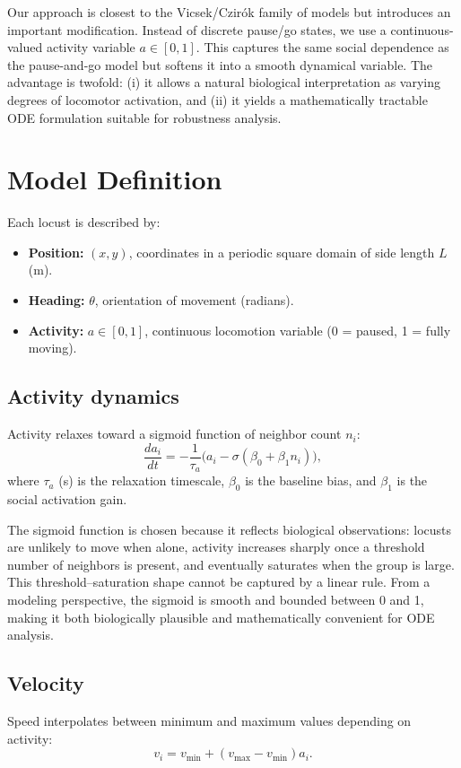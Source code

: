 \documentclass[11pt,a4paper]{article}
\begin{document}
Our approach is closest to the Vicsek/Czirók family of models but introduces an important modification. Instead of discrete pause/go states, we use a continuous-valued activity variable $a \in [0,1]$. This captures the same social dependence as the pause-and-go model but softens it into a smooth dynamical variable. The advantage is twofold: (i) it allows a natural biological interpretation as varying degrees of locomotor activation, and (ii) it yields a mathematically tractable ODE formulation suitable for robustness analysis.

\section{Model Definition}

Each locust is described by:
\begin{itemize}
    \item \textbf{Position:} $(x,y)$, coordinates in a periodic square domain of side length $L$ (m).
    \item \textbf{Heading:} $\theta$, orientation of movement (radians).
    \item \textbf{Activity:} $a \in [0,1]$, continuous locomotion variable (0 = paused, 1 = fully moving).
\end{itemize}

\subsection{Activity dynamics}
Activity relaxes toward a sigmoid function of neighbor count $n_i$:
\[
\frac{da_i}{dt} = -\frac{1}{\tau_a}\Big(a_i - \sigma(\beta_0 + \beta_1 n_i)\Big),
\]
where $\tau_a$ (s) is the relaxation timescale, $\beta_0$ is the baseline bias, and $\beta_1$ is the social activation gain. 

The sigmoid function is chosen because it reflects biological observations: locusts are unlikely to move when alone, activity increases sharply once a threshold number of neighbors is present, and eventually saturates when the group is large. This threshold–saturation shape cannot be captured by a linear rule. From a modeling perspective, the sigmoid is smooth and bounded between 0 and 1, making it both biologically plausible and mathematically convenient for ODE analysis.


\subsection{Velocity}
Speed interpolates between minimum and maximum values depending on activity:
\[
v_i = v_{\min} + (v_{\max} - v_{\min}) a_i.
\]
\end{document}
